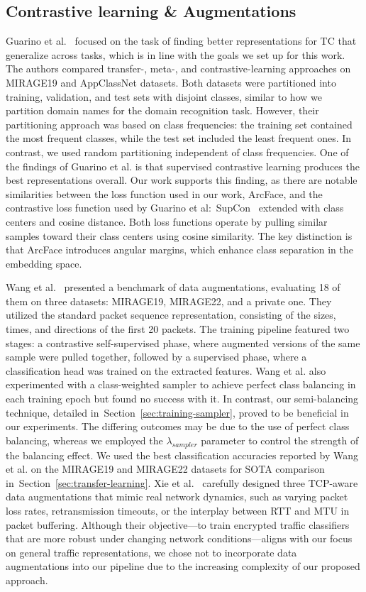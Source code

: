 \documentclass[lettersize,journal,twoside,article]{IEEEtran}
\newcommand{\secref}[1]{Section~\ref{#1}}
\begin{document}
\subsection{Contrastive learning \& Augmentations}
Guarino et al.~\cite{Guarino2023Many} focused on the task of finding better representations for TC that generalize across tasks, which is in line with the goals we set up for this work. The authors compared transfer-, meta-, and contrastive-learning approaches on MIRAGE19 and AppClassNet datasets. Both datasets were partitioned into training, validation, and test sets with disjoint classes, similar to how we partition domain names for the domain recognition task. However, their partitioning approach was based on class frequencies: the training set contained the most frequent classes, while the test set included the least frequent ones. In contrast, we used random partitioning independent of class frequencies. One of the findings of Guarino et al. is that supervised contrastive learning produces the best representations overall. Our work supports this finding, as there are notable similarities between the loss function used in our work, ArcFace, and the contrastive loss function used by Guarino et al:~SupCon~\cite{khosla2020supervised} extended with class centers and cosine distance. Both loss functions operate by pulling similar samples toward their class centers using cosine similarity. The key distinction is that ArcFace introduces angular margins, which enhance class separation in the embedding space.

Wang et al.~\cite{wang2024augmentation} presented a benchmark of data augmentations, evaluating 18 of them on three datasets: MIRAGE19, MIRAGE22, and a private one. They utilized the standard packet sequence representation, consisting of the sizes, times, and directions of the first 20 packets. The training pipeline featured two stages: a contrastive self-supervised phase, where augmented versions of the same sample were pulled together, followed by a supervised phase, where a classification head was trained on the extracted features. Wang et al. also experimented with a class-weighted sampler to achieve perfect class balancing in each training epoch but found no success with it. In contrast, our semi-balancing technique, detailed in~\secref{sec:training-sampler}, proved to be beneficial in our experiments. The differing outcomes may be due to the use of perfect class balancing, whereas we employed the $\lambda_{sampler}$ parameter to control the strength of the balancing effect. We used the best classification accuracies reported by Wang et al. on the MIRAGE19 and MIRAGE22 datasets for SOTA comparison in~\secref{sec:transfer-learning}. Xie et al.~\cite{Xie2023_Rosetta} carefully designed three TCP-aware data augmentations that mimic real network dynamics, such as varying packet loss rates, retransmission timeouts, or the interplay between RTT and MTU in packet buffering. Although their objective---to train encrypted traffic classifiers that are more robust under changing network conditions---aligns with our focus on general traffic representations, we chose not to incorporate data augmentations into our pipeline due to the increasing complexity of our proposed approach.
\end{document}
